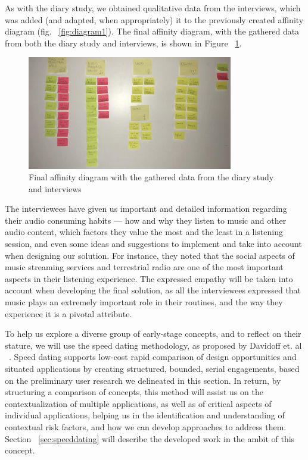 As with the diary study, we obtained qualitative data from the interviews, which was added (and adapted, when appropriately) it to the previously created affinity diagram (fig. ~\ref{fig:diagram1}). The final affinity diagram, with the gathered data from both the diary study and interviews, is shown in Figure ~\ref{fig:diagram2}.

\begin{figure}[h]
\centering
\includegraphics[width=0.8\textwidth]{./Images/finalaffinitydiagram.jpg}
\caption{Final affinity diagram with the gathered data from the diary study and interviews}
\label{fig:diagram2}
\end{figure}

The interviewees have given us important and detailed information regarding their audio consuming habits — how and why they listen to music and other audio content, which factors they value the most and the least in a listening session, and even some ideas and suggestions to implement and take into account when designing our solution. For instance, they noted that the social aspects of music streaming services and terrestrial radio are one of the most important aspects in their listening experience. The expressed empathy will be taken into account when developing the final solution, as all the interviewees expressed that music plays an extremely important role in their routines, and the way they experience it is a pivotal attribute.

To help us explore a diverse group of early-stage concepts, and to reflect on their stature, we will use the speed dating methodology, as proposed by Davidoff et. al ~\cite{Davidoff2007}. Speed dating supports low-cost rapid comparison of design opportunities and situated applications by creating structured, bounded, serial engagements, based on the preliminary user research we delineated in this section. In return, by structuring a comparison of concepts, this method will assist us on the contextualization of multiple applications, as well as of critical aspects of individual applications, helping us in the identification and understanding of contextual risk factors, and how we can develop approaches to address them. Section ~\ref{sec:speeddating} will describe the developed work in the ambit of this concept.